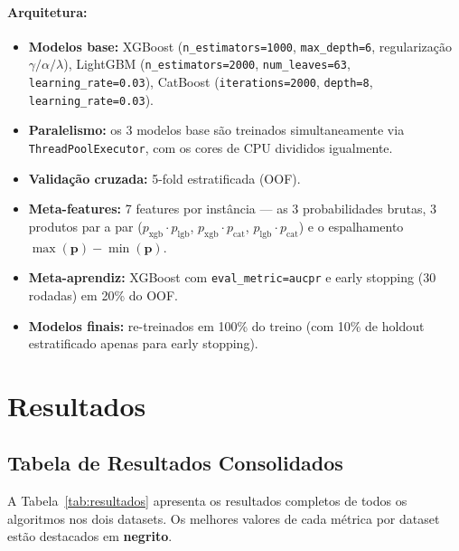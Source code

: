 \documentclass[12pt,a4paper]{article}
\begin{document}
\paragraph{Arquitetura:}
\begin{itemize}[nosep]
  \item \textbf{Modelos base:} XGBoost (\texttt{n\_estimators=1000},
    \texttt{max\_depth=6}, regularização $\gamma/\alpha/\lambda$),
    LightGBM (\texttt{n\_estimators=2000}, \texttt{num\_leaves=63},
    \texttt{learning\_rate=0.03}),
    CatBoost (\texttt{iterations=2000}, \texttt{depth=8},
    \texttt{learning\_rate=0.03}).
  \item \textbf{Paralelismo:} os 3 modelos base são treinados simultaneamente
    via \texttt{ThreadPoolExecutor}, com os cores de CPU divididos igualmente.
  \item \textbf{Validação cruzada:} 5-fold estratificada (OOF).
  \item \textbf{Meta-features:} 7 features por instância — as 3 probabilidades
    brutas, 3 produtos par a par ($p_\text{xgb} \cdot p_\text{lgb}$,
    $p_\text{xgb} \cdot p_\text{cat}$, $p_\text{lgb} \cdot p_\text{cat}$) e
    o espalhamento $\max(\mathbf{p}) - \min(\mathbf{p})$.
  \item \textbf{Meta-aprendiz:} XGBoost com \texttt{eval\_metric=aucpr} e
    early stopping (30 rodadas) em 20\% do OOF.
  \item \textbf{Modelos finais:} re-treinados em 100\% do treino (com 10\% de
    holdout estratificado apenas para early stopping).
\end{itemize}

\section{Resultados}
\label{sec:resultados}

\subsection{Tabela de Resultados Consolidados}
\label{sec:tabela}

A Tabela~\ref{tab:resultados} apresenta os resultados completos de todos os
algoritmos nos dois datasets. Os melhores valores de cada métrica por dataset
estão destacados em \textbf{negrito}.
\end{document}
